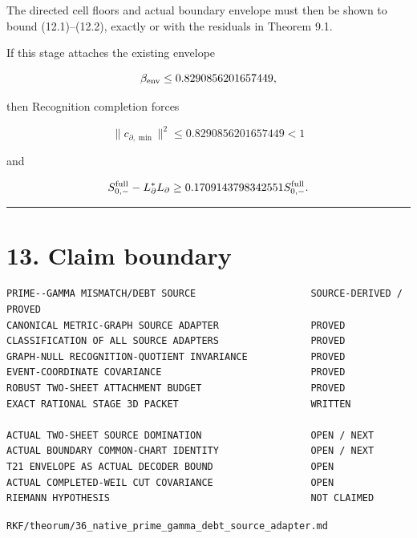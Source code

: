 The directed cell floors and actual boundary envelope must then be shown to
bound (12.1)--(12.2), exactly or with the residuals in Theorem 9.1.

If this stage attaches the existing envelope

\[
\beta_{\rm env}\le0.8290856201657449,
\]

then Recognition completion forces

\[
\|c_{\partial,\min}\|^2
\le0.8290856201657449<1
\]

and

\[
S_{0,-}^{\rm full}
-
L_\partial^*L_\partial
\ge
0.1709143798342551
S_{0,-}^{\rm full}.
\]

\begin{center}\rule{0.5\linewidth}{0.5pt}\end{center}

\hypertarget{claim-boundary}{%
\section{13. Claim boundary}\label{claim-boundary}}

\begin{verbatim}
PRIME--GAMMA MISMATCH/DEBT SOURCE                    SOURCE-DERIVED / PROVED
CANONICAL METRIC-GRAPH SOURCE ADAPTER                PROVED
CLASSIFICATION OF ALL SOURCE ADAPTERS                PROVED
GRAPH-NULL RECOGNITION-QUOTIENT INVARIANCE           PROVED
EVENT-COORDINATE COVARIANCE                          PROVED
ROBUST TWO-SHEET ATTACHMENT BUDGET                   PROVED
EXACT RATIONAL STAGE 3D PACKET                       WRITTEN

ACTUAL TWO-SHEET SOURCE DOMINATION                   OPEN / NEXT
ACTUAL BOUNDARY COMMON-CHART IDENTITY                OPEN / NEXT
T21 ENVELOPE AS ACTUAL DECODER BOUND                 OPEN
ACTUAL COMPLETED-WEIL CUT COVARIANCE                 OPEN
RIEMANN HYPOTHESIS                                   NOT CLAIMED
\end{verbatim}

\begin{flushright}\small\texttt{RKF/theorum/36\_native\_prime\_gamma\_debt\_source\_adapter.md}\end{flushright}
